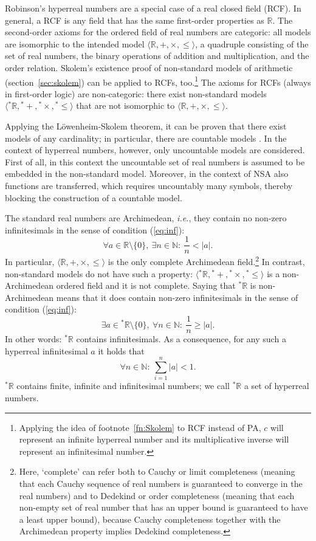 Robinson's hyperreal numbers are a special case of a real closed field (RCF). In general, a RCF is any field that has the same first-order properties as $\mathbb{R}$.
The second-order axioms for the ordered field of real numbers are categoric: all models are isomorphic to the intended model $\langle \mathbb{R}, +, \times, \leq \rangle$, a quadruple consisting of the set of real numbers, the binary operations of addition and multiplication, and the order relation.
Skolem's existence proof of non-standard models of arithmetic (section~\ref{sec:skolem}) can be applied to RCFs, too.\footnote{Applying the idea of footnote~\ref{fn:Skolem} to RCF instead of PA, $c$ will represent an infinite hyperreal number and its multiplicative inverse will represent an infinitesimal number.}
The axioms for RCFs (always in first-order logic) are non-categoric: there exist non-standard models $\langle {^\ast\mathbb{R}}, {^\ast +}, {^\ast \times}, {^\ast \! \leq} \rangle$ that are not isomorphic to $\langle \mathbb{R}, +, \times, \leq \rangle$.

Applying the L\"{o}wenheim-Skolem theorem, it can be proven that there exist models of any cardinality; in particular, there are countable models \citep[\textit{cf.}\ the ``paradox'' of][]{Skolem:1922}.
In the context of hyperreal numbers, however, only uncountable models are considered. First of all, in this context the uncountable set of real numbers is assumed to be embedded in the non-standard model. Moreover, in the context of NSA also functions are transferred, which requires uncountably many symbols, thereby blocking the construction of a countable model.

The standard real numbers are Archimedean, \textit{i.e.}, they contain no non-zero infinitesimals in the sense of condition (\ref{eq:inf}):
$$ \forall a \in \mathbb{R} \setminus \{0\}, \ \exists n \in \mathbb{N} : \ \frac{1}{n} < | a |. $$
In particular, $\langle \mathbb{R}, +, \times, \leq \rangle$ is the only complete Archimedean field.\footnote{Here, `complete' can refer both to Cauchy or limit completeness (meaning that each Cauchy sequence of real numbers is guaranteed to converge in the real numbers) and to Dedekind or order completeness (meaning that each non-empty set of real number that has an upper bound is guaranteed to have a least upper bound), because Cauchy completeness together with the Archimedean property implies Dedekind completeness.}
In contrast, non-standard models do not have such a property: $\langle {^\ast\mathbb{R}}, {^\ast +}, {^\ast \times}, {^\ast \leq} \rangle$ is a non-Archimedean ordered field and it is not complete.
Saying that ${^\ast\mathbb{R}}$ is non-Archimedean means that it does contain non-zero infinitesimals in the sense of condition (\ref{eq:inf}):
$$
	\exists a \in {^\ast\mathbb{R}} \setminus \{0\}, \ \forall n \in \mathbb{N} : \ \frac{1}{n} \geq | a |.
$$
In other words: ${^\ast\mathbb{R}}$ contains infinitesimals. As a consequence, for any such a hyperreal infinitesimal $a$ it holds that
$$
	\forall n \in \mathbb{N} : \ \sum_{i=1}^{n} | a | < 1.
$$
${^\ast\mathbb{R}}$ contains finite, infinite and infinitesimal numbers; we call ${^\ast\mathbb{R}}$ a set of hyperreal numbers.

